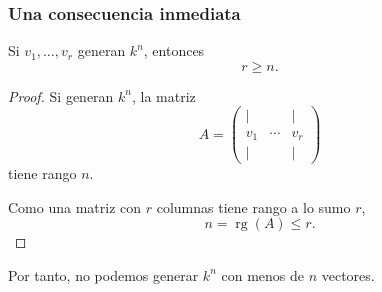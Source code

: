 \begin{frame}
    \frametitle{Una consecuencia inmediata}

    \begin{corollary}
        Si \(v_1,\ldots,v_r\) generan \(k^n\), entonces
        \[
            r\geq n.
        \]
    \end{corollary}

    \begin{proof}
        Si generan \(k^n\), la matriz
        \[
            A=
            \begin{pmatrix}
                \vert & & \vert\\
                v_1 & \cdots & v_r\\
                \vert & & \vert
            \end{pmatrix}
        \]
        tiene rango \(n\).

        Como una matriz con \(r\) columnas tiene rango a lo sumo \(r\),
        \[
            n=\operatorname{rg}(A)\leq r.
        \]
    \end{proof}

    \medskip

    Por tanto, no podemos generar \(k^n\) con menos de \(n\) vectores.
\end{frame}


